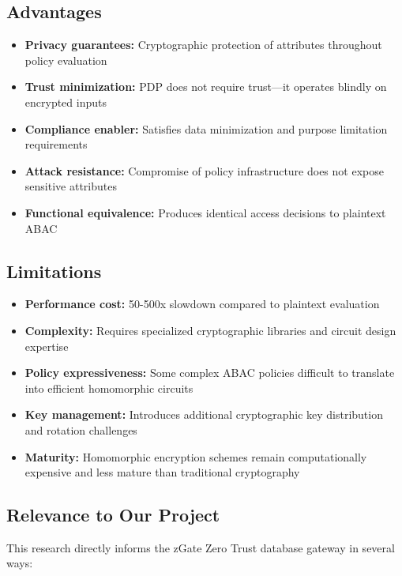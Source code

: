 \subsection{Advantages}

\begin{itemize}
    \item \textbf{Privacy guarantees:} Cryptographic protection of attributes throughout policy evaluation
    \item \textbf{Trust minimization:} PDP does not require trust—it operates blindly on encrypted inputs
    \item \textbf{Compliance enabler:} Satisfies data minimization and purpose limitation requirements
    \item \textbf{Attack resistance:} Compromise of policy infrastructure does not expose sensitive attributes
    \item \textbf{Functional equivalence:} Produces identical access decisions to plaintext ABAC
\end{itemize}

\subsection{Limitations}

\begin{itemize}
    \item \textbf{Performance cost:} 50-500x slowdown compared to plaintext evaluation
    \item \textbf{Complexity:} Requires specialized cryptographic libraries and circuit design expertise
    \item \textbf{Policy expressiveness:} Some complex ABAC policies difficult to translate into efficient homomorphic circuits
    \item \textbf{Key management:} Introduces additional cryptographic key distribution and rotation challenges
    \item \textbf{Maturity:} Homomorphic encryption schemes remain computationally expensive and less mature than traditional cryptography
\end{itemize}

\subsection{Relevance to Our Project}

This research directly informs the zGate Zero Trust database gateway in several ways:

